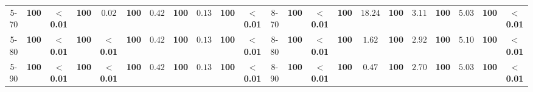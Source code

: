 \documentclass{article}
\begin{document}
\begin{table*}[t]
{{\begin{tabular}{ccccccccccc|ccccccccccc}
            5-70 & \textbf{100} & $\mathbf{<}$\textbf{0.01} & \textbf{100} & $0.02$ & \textbf{100} & $0.42$ & \textbf{100} & $0.13$ & \textbf{100} & $\mathbf{<}$\textbf{0.01} & 8-70 & \textbf{100} & $\mathbf{<}$\textbf{0.01} & \textbf{100} & $18.24$ & \textbf{100} & $3.11$ & \textbf{100} & $5.03$ & \textbf{100} & $\mathbf{<}$\textbf{0.01} \\
            5-80 & \textbf{100} & $\mathbf{<}$\textbf{0.01} & \textbf{100} & $\mathbf{<}$\textbf{0.01} & \textbf{100} & $0.42$ & \textbf{100} & $0.13$ & \textbf{100} & $\mathbf{<}$\textbf{0.01} & 8-80 & \textbf{100} & $\mathbf{<}$\textbf{0.01} & \textbf{100} & $1.62$ & \textbf{100} & $2.92$ & \textbf{100} & $5.10$ & \textbf{100} & $\mathbf{<}$\textbf{0.01} \\
            5-90 & \textbf{100} & $\mathbf{<}$\textbf{0.01} & \textbf{100} & $\mathbf{<}$\textbf{0.01} & \textbf{100} & $0.42$ & \textbf{100} & $0.13$ & \textbf{100} & $\mathbf{<}$\textbf{0.01} & 8-90 & \textbf{100} & $\mathbf{<}$\textbf{0.01} & \textbf{100} & $0.47$ & \textbf{100} & $2.70$ & \textbf{100} & $5.03$ & \textbf{100} & $\mathbf{<}$\textbf{0.01} \\


\end{tabular}}}
\end{table*}
\end{document}
